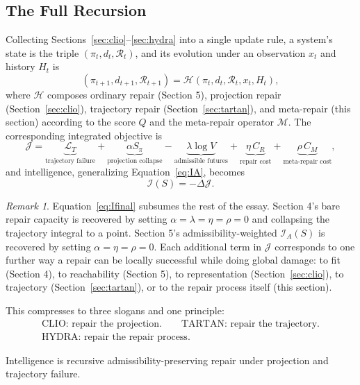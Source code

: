 \documentclass[11pt]{article}
\theoremstyle{plain}
\theoremstyle{definition}
\theoremstyle{remark}
\newtheorem{remark}[theorem]{Remark}
\begin{document}
\subsection{The Full Recursion}

Collecting Sections~\ref{sec:clio}--\ref{sec:hydra} into a single update rule, a system's state is the triple $(\pi_t, d_t, \mathcal{R}_t)$, and its evolution under an observation $x_t$ and history $H_t$ is
\begin{equation}
(\pi_{t+1}, d_{t+1}, \mathcal{R}_{t+1}) = \mathcal{H}(\pi_t, d_t, \mathcal{R}_t, x_t, H_t),
\label{eq:fullrecursion}
\end{equation}
where $\mathcal{H}$ composes ordinary repair (Section 5), projection repair (Section~\ref{sec:clio}), trajectory repair (Section~\ref{sec:tartan}), and meta-repair (this section) according to the score $Q$ and the meta-repair operator $\mathcal{M}$. The corresponding integrated objective is
\begin{equation}
\mathcal{J} = \underbrace{\mathcal{L}_T}_{\text{trajectory failure}} + \underbrace{\alpha S_\pi}_{\text{projection collapse}} - \underbrace{\lambda \log V}_{\text{admissible futures}} + \underbrace{\eta\, C_R}_{\text{repair cost}} + \underbrace{\rho\, C_M}_{\text{meta-repair cost}},
\label{eq:fullobjective}
\end{equation}
and intelligence, generalizing Equation~\eqref{eq:IA}, becomes
\begin{equation}
\boxed{\;\mathcal{I}(S) = -\Delta \mathcal{J}.\;}
\label{eq:Ifinal}
\end{equation}

\begin{remark}
Equation~\eqref{eq:Ifinal} subsumes the rest of the essay. Section 4's bare repair capacity is recovered by setting $\alpha=\lambda=\eta=\rho=0$ and collapsing the trajectory integral to a point. Section 5's admissibility-weighted $\mathcal{I}_A(S)$ is recovered by setting $\alpha=\eta=\rho=0$. Each additional term in $\mathcal{J}$ corresponds to one further way a repair can be locally successful while doing global damage: to fit (Section 4), to reachability (Section 5), to representation (Section~\ref{sec:clio}), to trajectory (Section~\ref{sec:tartan}), or to the repair process itself (this section).
\end{remark}

This compresses to three slogans and one principle:
\[
\begin{gathered}
\text{CLIO: repair the projection.} \qquad \text{TARTAN: repair the trajectory.}\\[2pt]
\text{HYDRA: repair the repair process.}
\end{gathered}
\]
\begin{tcolorbox}[title=Recursive Admissibility]
\centering
Intelligence is recursive admissibility-preserving repair under projection and trajectory failure.
\end{tcolorbox}
\end{document}

